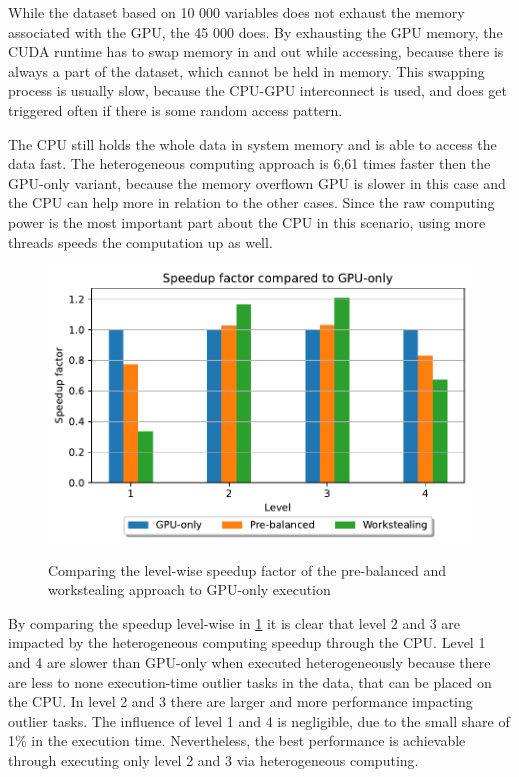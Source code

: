 While the dataset based on 10 000 variables does not exhaust the memory associated with the GPU, the 45 000 does. By exhausting the GPU memory, the CUDA runtime has to swap memory in and out while accessing, because there is always a part of the dataset, which cannot be held in memory. This swapping process is usually slow, because the CPU-GPU interconnect is used, and does get triggered often if there is some random access pattern.

The CPU still holds the whole data in system memory and is able to access the data fast. The heterogeneous computing approach is 6,61 times faster then the GPU-only variant, because the memory overflown GPU is slower in this case and the CPU can help more in relation to the other cases.
Since the raw computing power is the most important part about the CPU in this scenario, using more threads speeds the computation up as well.

\begin{figure}[h]
  \caption{Comparing the level-wise speedup factor of the pre-balanced and workstealing approach to GPU-only execution}
  \includegraphics[width=\textwidth]{figures/levelwise.pdf}
  \centering
  \label{fig:levelwise_delos}
\end{figure}

By comparing the speedup level-wise in \ref{fig:levelwise_delos} it is clear that level 2 and 3 are impacted by the heterogeneous computing speedup through the CPU. Level 1 and 4 are slower than GPU-only when executed heterogeneously because there are less to none execution-time outlier tasks in the data, that can be placed on the CPU. In level 2 and 3 there are larger and more performance impacting outlier tasks. The influence of level 1 and 4 is negligible, due to the small share of 1\% in the execution time. Nevertheless, the best performance is achievable through executing only level 2 and 3 via heterogeneous computing.


